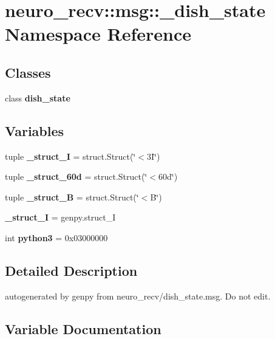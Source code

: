 \section{neuro\-\_\-recv\-:\-:msg\-:\-:\-\_\-dish\-\_\-state \-Namespace \-Reference}
\label{namespaceneuro__recv_1_1msg_1_1__dish__state}
\subsection*{\-Classes}
\begin{DoxyCompactItemize}
\item 
class {\bf dish\-\_\-state}
\end{DoxyCompactItemize}
\subsection*{\-Variables}
\begin{DoxyCompactItemize}
\item 
tuple {\bf \-\_\-struct\-\_\-I} = struct.\-Struct(\char`\"{}$<$3\-I\char`\"{})
\item 
tuple {\bf \-\_\-struct\-\_\-60d} = struct.\-Struct(\char`\"{}$<$60d\char`\"{})
\item 
tuple {\bf \-\_\-struct\-\_\-\-B} = struct.\-Struct(\char`\"{}$<$\-B\char`\"{})
\item 
{\bf \-\_\-struct\-\_\-\-I} = genpy.\-struct\-\_\-\-I
\item 
int {\bf python3} = 0x03000000
\end{DoxyCompactItemize}


\subsection{\-Detailed \-Description}
\begin{DoxyVerb}autogenerated by genpy from neuro_recv/dish_state.msg. Do not edit.\end{DoxyVerb}
 

\subsection{\-Variable \-Documentation}
